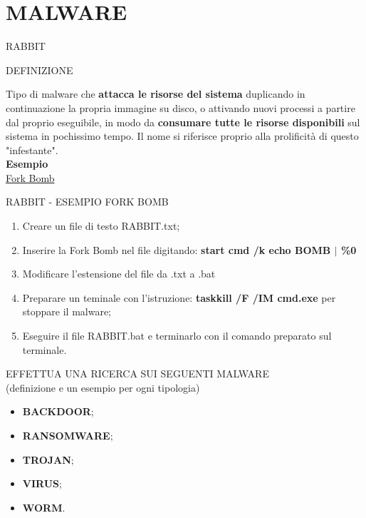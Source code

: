 \documentclass[aspectratio=1610, handout]{beamer}
\begin{document}
\section{MALWARE}

\begin{frame}{RABBIT}
    \begin{alertblock}{DEFINIZIONE}
        \begin{minipage}{0.98\linewidth}
            \justifying
            Tipo di malware che \textbf{attacca le risorse del sistema} duplicando in continuazione la propria 
            immagine su disco, o attivando nuovi processi a partire dal proprio eseguibile, 
            in modo da \textbf{consumare tutte le risorse disponibili} sul sistema in pochissimo tempo. 
            Il nome si riferisce proprio alla prolificità di questo "infestante".\\
            \bigskip
            \tiny{\textbf{Esempio}}\\
            \tiny{\href{https://it.wikipedia.org/wiki/Fork_bomb}{Fork Bomb}}
        \end{minipage}
    \end{alertblock}
\end{frame}

\begin{frame}{RABBIT - ESEMPIO FORK BOMB}
    \begin{enumerate}
        \item Creare un file di testo RABBIT.txt;
        \pause
        \item Inserire la Fork Bomb nel file digitando: \textbf{start cmd /k echo BOMB \textbf{$\mid$} \%0}
        \pause
        \item Modificare l’estensione del ﬁle da .txt a .bat
        \pause
        \item Preparare un teminale con l'istruzione: \textbf{taskkill /F /IM cmd.exe} per stoppare il malware;
        \pause
        \item Eseguire il file RABBIT.bat e terminarlo con il comando preparato sul terminale.
    \end{enumerate}                        
\end{frame}

\begin{frame}{EFFETTUA UNA RICERCA SUI SEGUENTI MALWARE\\(definizione e un esempio per ogni tipologia)}
    \begin{itemize}
        \item \textbf{BACKDOOR};
        \item \textbf{RANSOMWARE};
        \item \textbf{TROJAN};
        \item \textbf{VIRUS};
        \item \textbf{WORM}.
    \end{itemize}                        
\end{frame}
\end{document}

